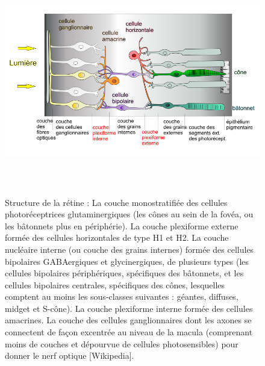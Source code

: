 \begin{figure}[h]
\begin{center}
\includegraphics[width=17cm,height=10cm]{figures/ch2_2_Retina}
\end{center}
\caption{ Structure de la rétine : La couche monostratifiée des cellules photoréceptrices glutaminergiques (les cônes au sein de la fovéa, ou les bâtonnets plus en périphérie). La couche plexiforme externe formée des cellules horizontales de type H1 et H2. La couche nucléaire interne (ou couche des grains internes) formée des cellules bipolaires GABAergiques et glycinergiques, de plusieurs types (les cellules bipolaires périphériques, spécifiques des bâtonnets, et les cellules bipolaires centrales, spécifiques des cônes, lesquelles comptent au moins les sous-classes suivantes : géantes, diffuses, midget et S-cône). La couche plexiforme interne formée des cellules amacrines. La couche des cellules ganglionnaires dont les axones se connectent de façon excentrée au niveau de la macula (comprenant moins de couches et dépourvue de cellules photosensibles) pour donner le nerf optique [Wikipedia].}
\label{Ret}
\end{figure}

